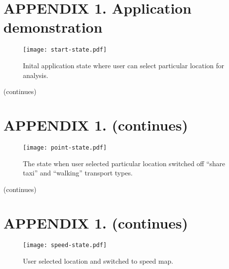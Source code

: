 
\renewcommand{\thefigure}{A\arabic{figure}}
\setcounter{figure}{0}

\thispagestyle{empty}
\section*{APPENDIX 1. Application demonstration}

\vfill

\begin{figure}[ht]
  \centering
  \captionsetup{justification=centering,margin=0.2cm}
  \texttt{[image: start-state.pdf]}
  \caption{Inital application state where user can select particular location for analysis.}
  \label{pic:startstate}
\end{figure}

\vfill
\begin{flushright}
  (continues)
\end{flushright}

\thispagestyle{empty}
\section*{APPENDIX 1. (continues)}

\vfill

\begin{figure}[ht]
  \centering
  \captionsetup{justification=centering,margin=0.2cm}
  \texttt{[image: point-state.pdf]}
  \caption{The state when user selected particular location switched off ``share taxi'' and
  ``walking'' transport types.}
  \label{pic:pointstate}
\end{figure}

\vfill
\begin{flushright}
  (continues)
\end{flushright}

\thispagestyle{empty}
\section*{APPENDIX 1. (continues)}

\vfill

\begin{figure}[ht]
  \centering
  \captionsetup{justification=centering,margin=0.2cm}
  \texttt{[image: speed-state.pdf]}
  \caption{User selected location and switched to speed map.}
  \label{pic:speedstate}
\end{figure}

